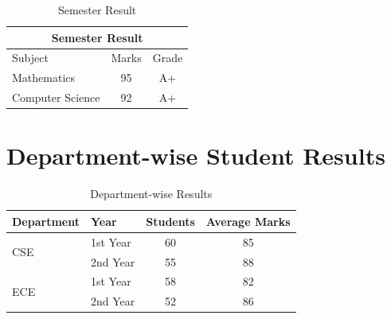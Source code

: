 \documentclass{article}
\begin{document}
		\begin{table}[h]
			\centering
			
			\caption{Semester Result}
			\label{tab:semester}
			
			\begin{tabular}{lcc}
				\toprule
				
				\multicolumn{3}{c}{\textbf{Semester Result}} \\
				
				\midrule
				
				Subject & Marks & Grade \\
				
				\midrule
				
				Mathematics & 95 & A+ \\
				Computer Science & 92 & A+ \\
				
				\bottomrule
			\end{tabular}
			
		\end{table}

		
		\section{Department-wise Student Results}
		
		\begin{table}[h]
			\centering
			
			\caption{Department-wise Results}
			\label{tab:department}
			
			\begin{tabular}{l l c c}
				\toprule
				Department & Year & Students & Average Marks \\
				\midrule
				
				\multirow{2}{*}{CSE}
				& 1st Year & 60 & 85 \\
				& 2nd Year & 55 & 88 \\
				\midrule
				
				\multirow{2}{*}{ECE}
				& 1st Year & 58 & 82 \\
				& 2nd Year & 52 & 86 \\
				
				\bottomrule
			\end{tabular}
			
		\end{table}
\end{document}
